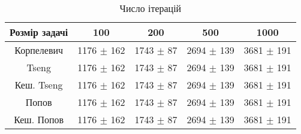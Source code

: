 \begin{table}[H]
	\centering
	\begin{tabular}{|c||c|c|c|c|}\hline
		Розмір задачі & 100 & 200 & 500 & 1000 \\ \hline \hline
		Корпелевич & 1176 $\pm$ 162 & 1743 $\pm$ 87 & 2694 $\pm$ 139 & 3681 $\pm$ 191 \\ \hline
		Tseng & 1176 $\pm$ 162 & 1743 $\pm$ 87 & 2694 $\pm$ 139 & 3681 $\pm$ 191 \\ \hline
		Кеш. Tseng & 1176 $\pm$ 162 & 1743 $\pm$ 87 & 2694 $\pm$ 139 & 3681 $\pm$ 191 \\ \hline
		Попов & 1176 $\pm$ 162 & 1743 $\pm$ 87 & 2694 $\pm$ 139 & 3681 $\pm$ 191 \\ \hline
		Кеш. Попов & 1176 $\pm$ 162 & 1743 $\pm$ 87 & 2694 $\pm$ 139 & 3681 $\pm$ 191 \\ \hline
	\end{tabular}
	\caption{Число ітерацій}
\end{table}
